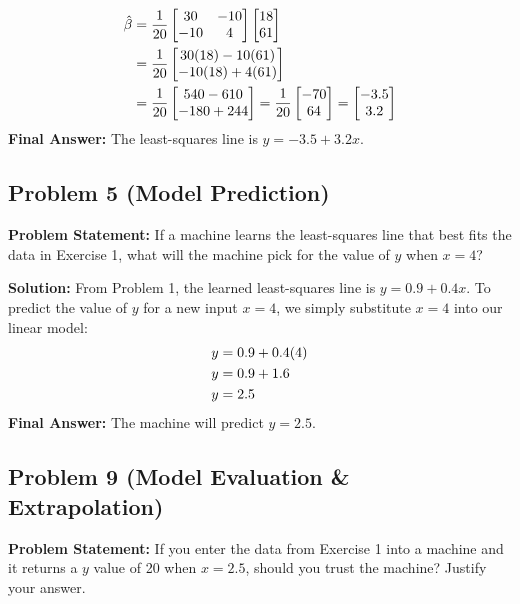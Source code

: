 \documentclass[11pt, letterpaper]{article}
\theoremstyle{definition}
\theoremstyle{remark}
\begin{document}
\begin{align*}
\hat{\beta} &= \frac{1}{20} \begin{bmatrix} 30 & -10 \\ -10 & 4 \end{bmatrix} \begin{bmatrix} 18 \\ 61 \end{bmatrix} \\ \relax
&= \frac{1}{20} \begin{bmatrix} 30(18) - 10(61) \\ -10(18) + 4(61) \end{bmatrix} \\ \relax
&= \frac{1}{20} \begin{bmatrix} 540 - 610 \\ -180 + 244 \end{bmatrix} = \frac{1}{20} \begin{bmatrix} -70 \\ 64 \end{bmatrix} = \begin{bmatrix} -3.5 \\ 3.2 \end{bmatrix}
\end{align*}
\textbf{Final Answer:} The least-squares line is $\displaystyle y = -3.5 + 3.2x$.

\subsection*{Problem 5 (Model Prediction)}
\textbf{Problem Statement:} If a machine learns the least-squares line that best fits the data in Exercise 1, what will the machine pick for the value of $y$ when $x = 4$?

\textbf{Solution:}
From Problem 1, the learned least-squares line is $y = 0.9 + 0.4x$. 
To predict the value of $y$ for a new input $x = 4$, we simply substitute $x = 4$ into our linear model:
\begin{align*}
y &= 0.9 + 0.4(4) \\ \relax
y &= 0.9 + 1.6 \\ \relax
y &= 2.5
\end{align*}
\textbf{Final Answer:} The machine will predict $\displaystyle y = 2.5$.

\subsection*{Problem 9 (Model Evaluation \& Extrapolation)}
\textbf{Problem Statement:} If you enter the data from Exercise 1 into a machine and it returns a $y$ value of 20 when $x = 2.5$, should you trust the machine? Justify your answer.
\end{document}
